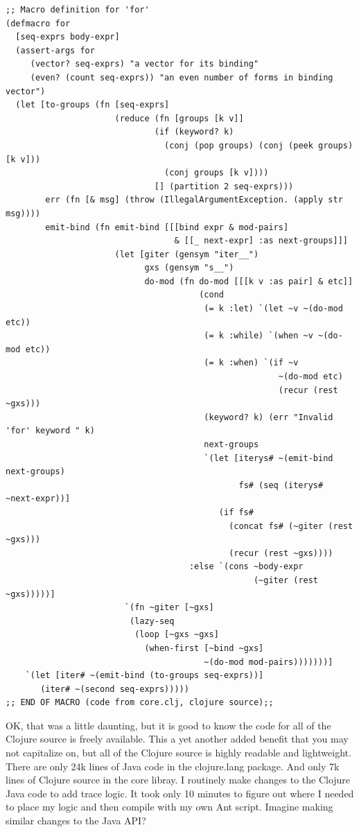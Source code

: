 \begin{verbatim}
;; Macro definition for 'for'
(defmacro for
  [seq-exprs body-expr]
  (assert-args for
     (vector? seq-exprs) "a vector for its binding"
     (even? (count seq-exprs)) "an even number of forms in binding vector")
  (let [to-groups (fn [seq-exprs]
                      (reduce (fn [groups [k v]]
                              (if (keyword? k)
                                (conj (pop groups) (conj (peek groups) [k v]))
                                (conj groups [k v])))
                              [] (partition 2 seq-exprs)))
        err (fn [& msg] (throw (IllegalArgumentException. (apply str msg))))
        emit-bind (fn emit-bind [[[bind expr & mod-pairs]
                                  & [[_ next-expr] :as next-groups]]]
                      (let [giter (gensym "iter__")
                            gxs (gensym "s__")
                            do-mod (fn do-mod [[[k v :as pair] & etc]]
                                       (cond
                                        (= k :let) `(let ~v ~(do-mod etc))
                                        (= k :while) `(when ~v ~(do-mod etc))
                                        (= k :when) `(if ~v
                                                       ~(do-mod etc)
                                                       (recur (rest ~gxs)))
                                        (keyword? k) (err "Invalid 'for' keyword " k)
                                        next-groups
                                        `(let [iterys# ~(emit-bind next-groups)
                                               fs# (seq (iterys# ~next-expr))]
                                           (if fs#
                                             (concat fs# (~giter (rest ~gxs)))
                                             (recur (rest ~gxs))))
                                     :else `(cons ~body-expr
                                                  (~giter (rest ~gxs)))))]
                        `(fn ~giter [~gxs]
                         (lazy-seq
                          (loop [~gxs ~gxs]
                            (when-first [~bind ~gxs]
                                        ~(do-mod mod-pairs)))))))]
    `(let [iter# ~(emit-bind (to-groups seq-exprs))]
       (iter# ~(second seq-exprs)))))
;; END OF MACRO (code from core.clj, clojure source);;
\end{verbatim}

OK, that was a little daunting, but it is good to know the code for all of the Clojure source is freely available. This a yet another added benefit that you may not capitalize on, but all of the Clojure source is highly readable and lightweight. There are only 24k lines of Java code in the clojure.lang package. And only 7k lines of Clojure source in the core libray. I routinely make changes to the Clojure Java code to add trace logic. It took only 10 minutes to figure out where I needed to place my logic and then compile with my own Ant script. Imagine making similar changes to the Java API?

